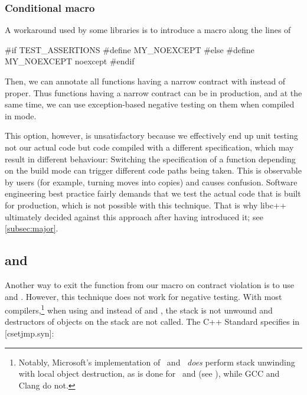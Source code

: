 \subsubsection{Conditional  macro}
\label{subsubsec:conditional}

A workaround used by some libraries is to introduce a macro along the lines of
\begin{codeblock}
#if TEST_ASSERTIONS
  #define MY_NOEXCEPT 
#else
  #define MY_NOEXCEPT noexcept
#endif
\end{codeblock}
Then, we can annotate all functions having a narrow contract with  instead of  proper. Thus functions having a narrow contract can be  in production, and at the same time, we can use exception-based negative testing on them when compiled in \mbox{} mode.

This option, however, is unsatisfactory because we effectively end up unit testing not our actual code but code compiled with a different specification, which may result in different behaviour: Switching the  specification of a function depending on the build mode can trigger different code paths being taken. This is observable by users (for example, turning moves into copies) and causes confusion. Software engineering best practice fairly demands that we test the actual code that is built for production, which is not possible with this technique. That is why libc++ ultimately decided against this approach after having introduced it; see \ref{subsec:major}.

\subsection{ and }

Another way to exit the function from our  macro on contract violation is to use  and . However, this technique does not work for negative testing. With most compilers,\footnote{Notably, Microsoft's implementation of   and  \emph{does} perform stack unwinding with local object destruction, as is done for  and  (see \cite{MSVCDocLongjmp}), while GCC and Clang do not.} when using  and  instead of  and , the stack is not unwound and destructors of objects on the stack are not called. The C++ Standard specifies in [csetjmp.syn]:

